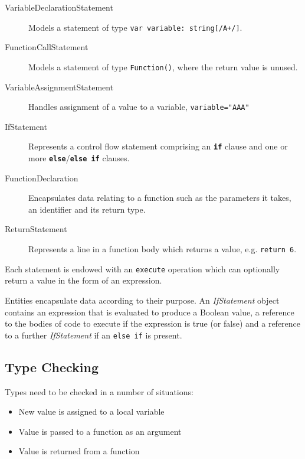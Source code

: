 \documentclass[a4paper,openany,12pt]{book}
\begin{document}
\begin{description}
    \item[VariableDeclarationStatement] Models a statement of type \texttt{var variable: string[/A+/]}.
    \item[FunctionCallStatement] Models a statement of type \texttt{Function()}, where the return value is unused.
    \item[VariableAssignmentStatement] Handles assignment of a value to a variable, \texttt{variable="AAA"}
    \item[IfStatement] Represents a control flow statement comprising an \textbf{\textcolor{id7-aubergine}{\texttt{if}}} clause and one or more \textbf{\textcolor{id7-aubergine}{\texttt{else}}}/\textbf{\textcolor{id7-aubergine}{\texttt{else if}}} clauses.
    \item[FunctionDeclaration] Encapsulates data relating to a function such as the parameters it takes, an identifier and its return type.
    \item[ReturnStatement] Represents a line in a function body which returns a value, e.g. \texttt{return 6}.
\end{description}

Each statement is endowed with an \texttt{execute} operation which can optionally return a value in the form of an
expression.

Entities encapsulate data according to their purpose.
An \textit{IfStatement} object contains an expression that is evaluated to produce a Boolean value, a reference to the
bodies of code to execute if the expression is true (or false) and a reference to a further \textit{IfStatement} if an
\texttt{else if} is present.

\subsection{Type Checking}

Types need to be checked in a number of situations:

\begin{itemize}
    \item New value is assigned to a local variable
    \item Value is passed to a function as an argument
    \item Value is returned from a function
\end{itemize}
\end{document}
